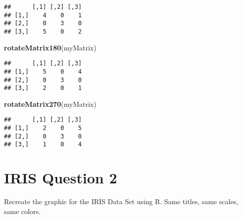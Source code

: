 \documentclass[
]{article}
\newenvironment{Shaded}{\begin{snugshade}}{\end{snugshade}}
\newcommand{\DataTypeTok}[1]{\textcolor[rgb]{0.13,0.29,0.53}{#1}}
\newcommand{\DecValTok}[1]{\textcolor[rgb]{0.00,0.00,0.81}{#1}}
\newcommand{\FloatTok}[1]{\textcolor[rgb]{0.00,0.00,0.81}{#1}}
\newcommand{\KeywordTok}[1]{\textcolor[rgb]{0.13,0.29,0.53}{\textbf{#1}}}
\newcommand{\NormalTok}[1]{#1}
\newcommand{\OperatorTok}[1]{\textcolor[rgb]{0.81,0.36,0.00}{\textbf{#1}}}
\newcommand{\StringTok}[1]{\textcolor[rgb]{0.31,0.60,0.02}{#1}}
\begin{document}
\begin{verbatim}
##      [,1] [,2] [,3]
## [1,]    4    0    1
## [2,]    0    3    0
## [3,]    5    0    2
\end{verbatim}

\begin{Shaded}
\begin{Highlighting}[]
\KeywordTok{rotateMatrix180}\NormalTok{(myMatrix)}
\end{Highlighting}
\end{Shaded}

\begin{verbatim}
##      [,1] [,2] [,3]
## [1,]    5    0    4
## [2,]    0    3    0
## [3,]    2    0    1
\end{verbatim}

\begin{Shaded}
\begin{Highlighting}[]
\KeywordTok{rotateMatrix270}\NormalTok{(myMatrix)}
\end{Highlighting}
\end{Shaded}

\begin{verbatim}
##      [,1] [,2] [,3]
## [1,]    2    0    5
## [2,]    0    3    0
## [3,]    1    0    4
\end{verbatim}

\hypertarget{iris-question-2}{%
\section{IRIS Question 2}\label{iris-question-2}}

Recreate the graphic for the IRIS Data Set using R. Same titles, same
scales, same colors.

\begin{Shaded}
\end{Shaded}
\end{document}
